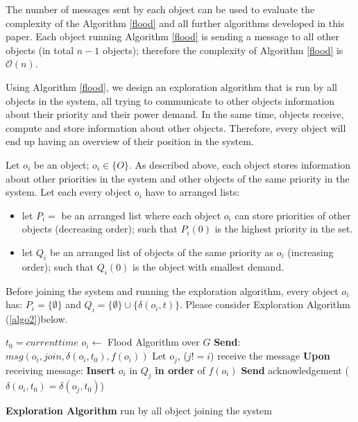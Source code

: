 \documentclass[letterpaper, 10 pt, conference]{ieeeconf}
\begin{document}
The number of messages sent by each object can be used to evaluate the complexity of the Algorithm \ref{flood} and all further algorithms developed in this paper. Each object running Algorithm \ref{flood} is sending a message to all other objects (in total $n-1$ objects); therefore the complexity of Algorithm \ref{flood} is $\mathcal{O}(n)$.

Using Algorithm \ref{flood}, we design an exploration algorithm that is run by all objects in the system, all trying to communicate to other objects information about their priority and their power demand. In the same time, objects receive, compute and store information about other objects. Therefore, every object will end up having an overview of their position in the system.

Let $o_{i}$ be an object; $o_{i} \in\{O\}$. As described above, each object stores information about other priorities in the system and other objects of the same priority in the system. Let each every object $o_{i}$ have to arranged lists:
\begin{itemize}
    \item let $P_{i}=$ be an arranged list where each object $o_{i}$ can store priorities of other objects (decreasing order); such that $P_{i}(0)$ is the highest priority in the set.
    \item let $Q_{i}$ be an arranged list of objects of the same priority as $o_{i}$ (increasing order); such that $Q_{i}(0)$ is the object with smallest demand.
\end{itemize}

Before joining the system and running the exploration algorithm, every object $o_{i}$ has: $P_{i}=\{\emptyset\}$ and $Q_{i}=\{\emptyset\}\cup\{\delta(o_{i},t)\}$. Please consider Exploration Algorithm (\ref{algo2})below.

\LinesNumbered
\IncMargin{1em}
\begin{algorithm}
$t_{0} = current time$
\BlankLine
$o_{i} \gets$ Flood Algorithm over $G$ \newline
\textbf{Send}: $msg(o_{i}, join, \delta(o_{i}, t_{0}), f(o_{i}))$
\BlankLine
{} {
    Let $o_{j}$, ($j!=i$) receive the message
    \BlankLine
    \textbf{Upon} receiving message:\newline
    {
       \textbf{Insert} $o_{i}$ in $Q_{j}$ \textbf{in order} of $f(o_{i})$
       \BlankLine
       \textbf{Send} acknowledgement ($\delta(o_{i},t_{0}) = \delta(o_{j},t_{0})$)
    }
}
\caption{\textbf{Exploration Algorithm} run by all object joining the system} \label{algo2}
\end{algorithm}
\DecMargin{1em}
\end{document}

